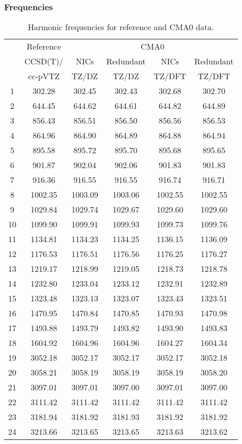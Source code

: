 \documentclass[10pt,oneside]{article}
\begin{document}
\begin{table}[h!]
\subsubsection*{Frequencies}
\centering
\caption{Harmonic frequencies for reference and CMA0 data.}
\begin{tabular}{cccccc}
\toprule
{} & Reference & \multicolumn{4}{c}{CMA0} \\
{} &  CCSD(T)/ &    NICs &  Redundant &    NICs & Redundant \\
{} &   cc-pVTZ &   TZ/DZ &      TZ/DZ &  TZ/DFT &    TZ/DFT \\
\midrule
1  &    302.28 &  302.45 &     302.43 &  302.68 &    302.70 \\
2  &    644.45 &  644.62 &     644.61 &  644.82 &    644.89 \\
3  &    856.43 &  856.51 &     856.50 &  856.56 &    856.53 \\
4  &    864.96 &  864.90 &     864.89 &  864.88 &    864.94 \\
5  &    895.58 &  895.72 &     895.70 &  895.68 &    895.65 \\
6  &    901.87 &  902.04 &     902.06 &  901.83 &    901.83 \\
7  &    916.36 &  916.55 &     916.55 &  916.74 &    916.71 \\
8  &   1002.35 & 1003.09 &    1003.06 & 1002.55 &   1002.55 \\
9  &   1029.84 & 1029.74 &    1029.67 & 1029.60 &   1029.60 \\
10 &   1099.90 & 1099.91 &    1099.93 & 1099.73 &   1099.76 \\
11 &   1134.81 & 1134.23 &    1134.25 & 1136.15 &   1136.09 \\
12 &   1176.53 & 1176.51 &    1176.56 & 1176.25 &   1176.27 \\
13 &   1219.17 & 1218.99 &    1219.05 & 1218.73 &   1218.78 \\
14 &   1232.80 & 1233.04 &    1233.12 & 1232.91 &   1232.89 \\
15 &   1323.48 & 1323.13 &    1323.07 & 1323.43 &   1323.51 \\
16 &   1470.95 & 1470.84 &    1470.85 & 1470.93 &   1470.98 \\
17 &   1493.88 & 1493.79 &    1493.82 & 1493.90 &   1493.83 \\
18 &   1604.92 & 1604.96 &    1604.96 & 1604.27 &   1604.34 \\
19 &   3052.18 & 3052.17 &    3052.17 & 3052.17 &   3052.18 \\
20 &   3058.21 & 3058.19 &    3058.19 & 3058.19 &   3058.20 \\
21 &   3097.01 & 3097.01 &    3097.00 & 3097.01 &   3097.00 \\
22 &   3111.42 & 3111.42 &    3111.42 & 3111.42 &   3111.42 \\
23 &   3181.94 & 3181.92 &    3181.93 & 3181.92 &   3181.92 \\
24 &   3213.66 & 3213.65 &    3213.65 & 3213.63 &   3213.62 \\
\bottomrule
\end{tabular}
\end{table}
\end{document}
